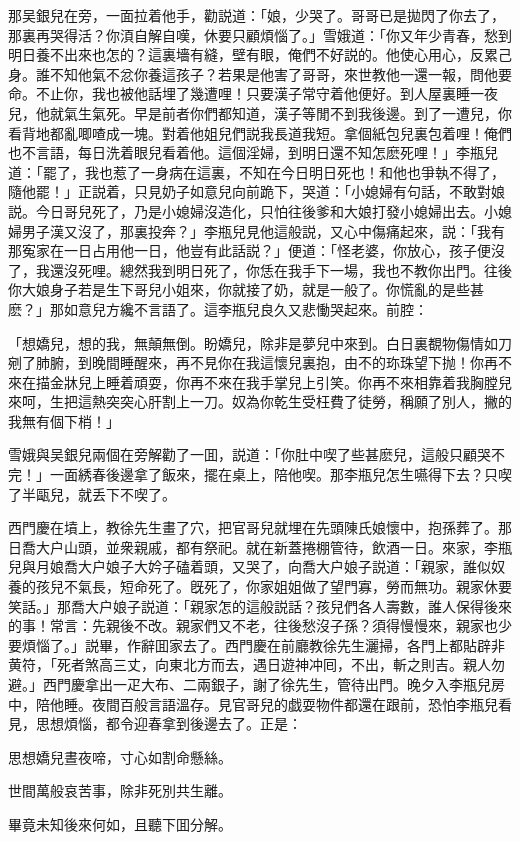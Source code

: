 那吴銀兒在旁，一面拉着他手，勸説道：「娘，少哭了。哥哥已是拋閃了你去了，那裏再哭得活？你湏自解自嘆，休要只顧煩惱了。」雪娥道：「你又年少青春，愁到明日養不出來也怎的？這裏墻有縫，壁有眼，俺們不好説的。他使心用心，反累己身。誰不知他氣不忿你養這孩子？若果是他害了哥哥，來世教他一還一報，問他要命。不止你，我也被他話埋了幾遭哩！只要漢子常守着他便好。到人屋裏睡一夜兒，他就氣生氣死。早是前者你們都知道，漢子等閒不到我後邊。到了一遭兒，你看背地都亂唧喳成一塊。對着他姐兒們説我長道我短。拿個紙包兒裏包着哩！俺們也不言語，每日洗着眼兒看着他。這個淫婦，到明日還不知怎麽死哩！」李瓶兒道：「罷了，我也惹了一身病在這裏，不知在今日明日死也！和他也爭執不得了，隨他罷！」正説着，只見奶子如意兒向前跪下，哭道：「小媳婦有句話，不敢對娘説。今日哥兒死了，乃是小媳婦沒造化，只怕往後爹和大娘打發小媳婦出去。小媳婦男子漢又沒了，那裏投奔？」李瓶兒見他這般説，又心中傷痛起來，説：「我有那寃家在一日占用他一日，他豈有此話説？」便道：「怪老婆，你放心，孩子便沒了，我還沒死哩。總然我到明日死了，你恁在我手下一場，我也不教你出門。往後你大娘身子若是生下哥兒小姐來，你就接了奶，就是一般了。你慌亂的是些甚麽？」那如意兒方纔不言語了。這李瓶兒良久又悲慟哭起來。前腔：

\begin{myquote}
「想嬌兒，想的我，無顛無倒。盼嬌兒，除非是夢兒中來到。白日裏覩物傷情如刀剜了肺腑，到晚間睡醒來，再不見你在我這懷兒裏抱，由不的珎珠望下抛！你再不來在描金牀兒上睡着頑耍，你再不來在我手掌兒上引笑。你再不來相靠着我胸膛兒來呵，生把這熱突突心肝割上一刀。奴為你乾生受枉費了徒勞，稱願了別人，撇的我無有個下梢！」
\end{myquote}

雪娥與吴銀兒兩個在旁解勸了一囬，説道：「你肚中喫了些甚麽兒，這般只顧哭不完！」一面綉春後邊拿了飯來，擺在桌上，陪他喫。那李瓶兒怎生嚥得下去？只喫了半甌兒，就丢下不喫了。

西門慶在墳上，教徐先生畫了穴，把官哥兒就埋在先頭陳氏娘懷中，抱孫葬了。那日喬大户山頭，並衆親戚，都有祭祀。就在新蓋捲棚管待，飲酒一日。來家，李瓶兒與月娘喬大户娘子大妗子磕着頭，又哭了，向喬大户娘子説道：「親家，誰似奴養的孩兒不氣長，短命死了。旣死了，你家姐姐做了望門寡，勞而無功。親家休要笑話。」那喬大户娘子説道：「親家怎的這般説話？孩兒們各人壽數，誰人保得後來的事！常言：先親後不改。親家們又不老，往後愁沒子孫？須得慢慢來，親家也少要煩惱了。」説畢，作辭囬家去了。西門慶在前廳教徐先生灑掃，各門上都貼辟非黄符，「死者煞高三丈，向東北方而去，遇日遊神冲囘，不出，斬之則吉。親人勿避。」西門慶拿出一疋大布、二兩銀子，謝了徐先生，管待出門。晚夕入李瓶兒房中，陪他睡。夜間百般言語溫存。見官哥兒的戯耍物件都還在跟前，恐怕李瓶兒看見，思想煩惱，都令迎春拿到後邊去了。正是：

\begin{myquote}
思想嬌兒晝夜啼，寸心如割命懸絲。

世間萬般哀苦事，除非死別共生離。
\end{myquote}

畢竟未知後來何如，且聽下囬分解。

